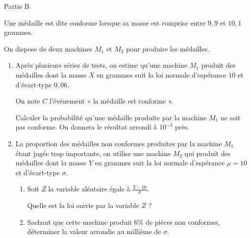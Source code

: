 \begin{h3}Partie B\end{h3}
Une médaille est dite conforme lorsque sa masse est comprise entre $9,9$ et $10,1$ grammes.
\par
On dispose de deux machines $M_1$ et $M_2$ pour produire les médailles.
\begin{enumerate}
     \item
     Après plusieurs séries de tests, on estime qu'une machine $M_1$ produit des médailles dont la masse $X$ en grammes suit la loi normale d'espérance $10$ et d'écart-type $0,06$.
     \par
     On note $C$ l'événement « la médaille est conforme ».
     \par
     Calculer la probabilité qu'une médaille produite par la machine $M_1$ ne soit pas conforme. On donnera le résultat arrondi à $10^{-3}$ près.
     \item
     La proportion des médailles non conformes produites par la machine $M_1$ étant jugée trop importante, on utilise une machine $M_2$ qui produit des médailles dont la masse $Y$ en grammes suit la loi normale d'espérance $\mu = 10$ et d'écart-type $\sigma$.
     \begin{enumerate}[label=\alph*.]
          \item
          Soit $Z$ la variable aléatoire égale à $\frac{Y-10}{\sigma}$.
          \par
          Quelle est la loi suivie par la variable $Z$ ?
          \item
          Sachant que cette machine produit $6$\% de pièces non conformes, déterminer la valeur arrondie au millième de $\sigma$.
     \end{enumerate}
\end{enumerate}
